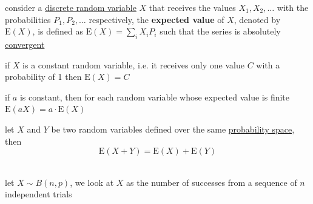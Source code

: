\documentclass[a4paper,12pt]{article}
\newcommand{\?}{\stackrel{?}{=}}
\begin{document}
\newenvironment{note}
  {\begin{bclogo}[logo=\bcinfo, couleurBarre=orange, couleur=lightgray]{ note}}
  {\end{bclogo}}
\newenvironment{attention}
  {\begin{bclogo}[logo=\bcattention, couleurBarre=red, noborder=true, 
                couleur=red!15]{Important!}}
  {\end{bclogo}}

consider a \href{20230121192455-discrete_random_variable.org}{discrete random variable} \(X\) that receives the values \(X_1,X_2,\dots\) with the probabilities \(P_1,P_2,\dots\) respectively, the \textbf{expected value} of \(X\), denoted by \(\mathrm{E}(X)\), is defined as \(\mathrm{E}(X)=\sum_{i} X_iP_i\) such that the series is absolutely \href{calculus2.org}{convergent}\\[0pt]
\begin{characteristic}
if \(X\) is a constant random variable, i.e. it receives only one value \(C\) with a probability of 1 then \(\mathrm{E}(X)=C\)\\[0pt]
\end{characteristic}
\begin{characteristic}
if \(a\) is constant, then for each random variable whose expected value is finite \(\mathrm{E}(aX)=a\cdot \mathrm{E}(X)\)\\[0pt]
\end{characteristic}
\begin{characteristic}
let \(X\) and \(Y\) be two random variables defined over the same \href{probability.org}{probability space}, then\\[0pt]
\[
\mathrm{E}(X+Y)=\mathrm{E}(X)+\mathrm{E}(Y)
\]\\[0pt]
\begin{my_example}
let \(X \sim B(n,p)\), we look at \(X\) as the number of successes from a sequence of \(n\) independent trials\\[0pt]
\end{my_example}
\label{org8c37d7e}
\end{characteristic}
\end{document}
